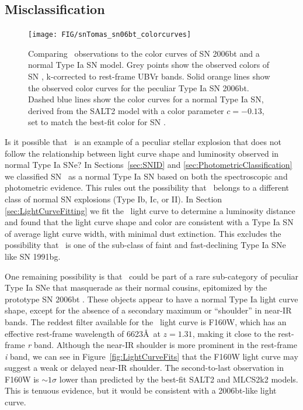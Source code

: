 \subsection{Misclassification}
\label{sec:Misclassification}

\begin{figure}
\begin{center}
\texttt{[image: FIG/snTomas\_sn06bt\_colorcurves]}
\caption{ 
Comparing \tomas\ observations to the color curves of SN 2006bt and a
normal Type Ia SN model. Grey points show the observed colors of
SN \tomas, k-corrected to rest-frame UBVr bands. Solid orange lines
show the observed color curves for the peculiar Type Ia SN
2006bt. Dashed blue lines show the color curves for a normal Type Ia
SN, derived from the SALT2 model with a color parameter $c=-0.13$, set
to match the best-fit color for SN \tomas.
\label{fig:colorcomparison} }
\end{center}
\end{figure}

Is it possible that \tomas\ is an example of a peculiar stellar
explosion that does not follow the relationship between light curve
shape and luminosity observed in normal Type Ia SNe?  In
Sections~\ref{sec:SNID} and \ref{sec:PhotometricClassification} we
classified SN \tomas\ as a normal Type Ia SN based on both the
spectroscopic and photometric evidence.  This rules out the
possibility that \tomas\ belongs to a different class of normal SN
explosions (Type Ib, Ic, or II). In
Section \ref{sec:LightCurveFitting} we fit the \tomas\ light curve to
determine a luminosity distance and found that the light curve shape
and color are consistent with a Type Ia SN of average light curve
width, with minimal dust extinction.  This excludes the possibility
that \tomas\ is one of the sub-class of faint and fast-declining Type
Ia SNe like SN 1991bg.

One remaining possibility is that \tomas\ could be part of a rare
sub-category of peculiar Type Ia SNe that masquerade as their normal
cousins, epitomized by the prototype SN 2006bt \citep{Foley:2010}.
These objects appear to have a normal Type Ia light curve shape,
except for the absence of a secondary maximum or ``shoulder'' in
near-IR bands.  The reddest filter available for the \tomas\ light
curve is F160W, which has an effective rest-frame wavelength of
6623\AA\ at $z=1.31$, making it close to the rest-frame {\it r} band.
Although the near-IR shoulder is more prominent in the rest-frame {\it
i} band, we can see in Figure~\ref{fig:LightCurveFits} that the F160W
light curve may suggest a weak or delayed near-IR shoulder.  The
second-to-last observation in F160W is $\sim1\sigma$ lower than
predicted by the best-fit SALT2 and MLCS2k2 models. This is tenuous
evidence, but it would be consistent with a 2006bt-like light curve.


